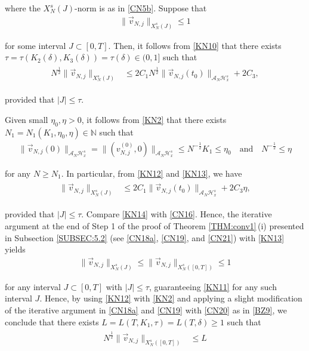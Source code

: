 \documentclass[letterpaper, 11pt,  reqno]{amsart}
\newcommand{\1}{\hspace{0.5mm}\text{I}\hspace{0.2mm}}
\newcommand{\noi}{\noindent}
\newcommand{\N}{\mathbb{N}}
\renewcommand{\H}{\mathcal{H}}
\newcommand{\dl}{\delta}
\newcommand{\A}{\mathcal{A}}
\numberwithin{equation}{section}
\numberwithin{theorem}{section}
\begin{document}
\noi
where
the $X^s_{N}(J)$-norm is as in 
\eqref{CN5b}.
Suppose that 
\begin{align}
\|\vec  v_{N, j}\|_{X^s_{N}(J)}
\le 1
\label{KN11}
\end{align}

\noi
for some interval $J \subset [0, T]$.
Then, 
it follows from \eqref{KN10} that 
there exists $\tau = \tau (K_2(\dl), K_3(\dl) ) = \tau(\dl) \in (0, 1]$ such that 
\begin{align}
\begin{split}
N^{\frac 12}\|\vec v_{N, j}\|_{X^s_{N}(J)}
& \le 
2 C_1 
N^{\frac 12}\|\vec  v_{N, j} (t_0) \|_{\A_N \H^s_x} 
+2 C_3 , 
\end{split}
\label{KN12}
\end{align}

\noi
provided that $|J| \le \tau$.


Given small $\eta_0, \eta > 0$, 
it follows from 
\eqref{KN2}
that there exists $N_1 = N_1(K_1, \eta_0, \eta) \in \N $
such that 
\begin{align}
\|\vec  v_{N, j} (0) \|_{\A_N \H^s_x} 
= \| (v_{N, j}^{(0)}, 0 ) \|_{\A_N \H^s_x} 
\le N^{-\frac 12} K_1 \le \eta_0
\quad \text{and}
\quad 
N^{-\frac 12} \le \eta
\label{KN13}
\end{align}


\noi
for any $N \ge N_1$.
In particular, 
from \eqref{KN12} and \eqref{KN13}, we have
\begin{align}
\begin{split}
\|\vec v_{N, j}\|_{X^s_{N}(J)}
& \le 
2 C_1 
\|\vec  v_{N, j} (t_0) \|_{\A_N \H^s_x} 
+2 C_3 \eta , 
\end{split}
\label{KN14}
\end{align}

\noi
provided that $|J| \le \tau$.
Compare \eqref{KN14} with \eqref{CN16}.
Hence, the iterative argument
at the end of Step 1
of the proof of Theorem \ref{THM:conv1}\,(i)
presented in Subsection \ref{SUBSEC:5.2}
(see 
\eqref{CN18a},
\eqref{CN19}, and \eqref{CN21})
with \eqref{KN13}
yields
\begin{align*}
\|\vec  v_{N, j}\|_{X^s_{N}(J)}
\le \|\vec  v_{N, j}\|_{X^s_{N}([0, T])}
\le 1
\end{align*}

\noi
for any interval $J \subset [0, T]$
with  $|J| \le \tau$, 
guaranteeing 
\eqref{KN11}
for any such interval $J$.
Hence, by 
using \eqref{KN12} with \eqref{KN2} 
and applying 
a slight modification of the iterative argument in 
\eqref{CN18a}  and 
\eqref{CN19} with  \eqref{CN20}
as in \eqref{BZ9}, 
we conclude that 
there exists 
$L = L(T, K_1, \tau) = L(T, \dl) \ge 1$
such that 
\begin{align}
\begin{split}
N^\frac 12 \|\vec v_{N, j}\|_{X^s_N([0, T])}
& \le L
\end{split}
\label{KN15}
\end{align}
\end{document}
